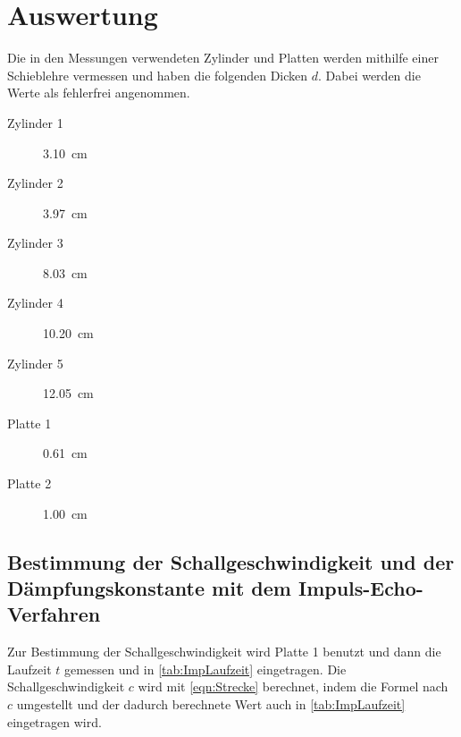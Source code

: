 \section{Auswertung}
\label{sec:Auswertung}

Die in den Messungen verwendeten Zylinder und Platten werden mithilfe einer Schieblehre vermessen und haben die folgenden Dicken $d$.
Dabei werden die Werte als fehlerfrei angenommen.
\begin{description}
  \item[Zylinder 1] \SI{3.10}{\centi\meter}
  \item[Zylinder 2] \SI{3.97}{\centi\meter}
  \item[Zylinder 3] \SI{8.03}{\centi\meter}
  \item[Zylinder 4] \SI{10.20}{\centi\meter}
  \item[Zylinder 5] \SI{12.05}{\centi\meter}
  \item[Platte 1] \SI{0.61}{\centi\meter}
  \item[Platte 2] \SI{1.00}{\centi\meter}
\end{description}

\subsection{Bestimmung der Schallgeschwindigkeit und der Dämpfungskonstante mit dem Impuls-Echo-Verfahren}
\label{sub:ImpEch}
Zur Bestimmung der Schallgeschwindigkeit wird Platte 1 benutzt und dann die Laufzeit $t$ gemessen und in \autoref{tab:ImpLaufzeit} eingetragen.
Die Schallgeschwindigkeit $c$ wird mit \autoref{eqn:Strecke} berechnet, indem die Formel nach $c$ umgestellt und der dadurch berechnete Wert auch in \autoref{tab:ImpLaufzeit} 
eingetragen wird.

